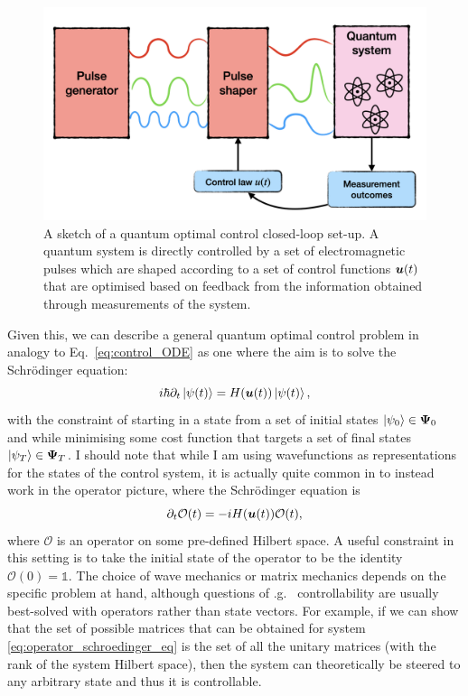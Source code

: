 \begin{figure}[t]
\centering
\includegraphics[width=0.8\linewidth]{images_v1/optimal_control_placeholder.png} \caption[Schematic diagram of open-loop quantum optimal control]{A sketch of a quantum optimal control closed-loop set-up. A quantum system is directly controlled by a set of electromagnetic pulses which are shaped according to a set of control functions $\boldsymbol{u}(t)$ that are optimised based on feedback from the information obtained through measurements of the system.}\label{fig:quantum_optimal_control}
\end{figure}

Given this, we can describe a general quantum optimal control problem in analogy to Eq.~\eqref{eq:control_ODE} as one where the aim is to solve the Schr\"{o}dinger equation:
\begin{equation}\label{eq:optimal_control_schroedinger}
    i \hbar \partial_t \ket{\psi(t)} = H(\boldsymbol{u}(t))\ket{\psi(t)},
\end{equation}
with the constraint of starting in a state from a set of initial states $\ket{\psi_0} \in \boldsymbol \Psi_0$ and while minimising some cost function that targets a set of final states $\ket{\psi_T} \in \boldsymbol \Psi_T$. I should note that while I am using wavefunctions as representations for the states of the control system, it is actually quite common in  to instead work in the operator picture, where the Schr\"{o}dinger equation is
\begin{equation}\label{eq:operator_schroedinger_eq}
    \partial_t \mathcal{O}(t) = -i H(\boldsymbol{u}(t))\mathcal{O}(t),
\end{equation}
where $\mathcal{O}$ is an operator on some pre-defined Hilbert space. A useful constraint in this setting is to take the initial state of the operator to be the identity $\mathcal{O}(0) = \mathds{1}$. The choice of wave mechanics or matrix mechanics depends on the specific  problem at hand, although questions of \@e.g.~ controllability are usually best-solved with operators rather than state vectors. For example, if we can show that the set of possible matrices that can be obtained for system \eqref{eq:operator_schroedinger_eq} is the set of all the unitary matrices (with the rank of the system Hilbert space), then the system can theoretically be steered to any arbitrary state and thus it is controllable.


